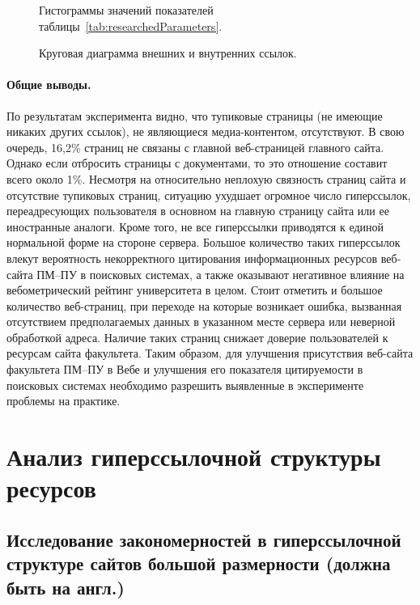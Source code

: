 \begin{figure}[ht]
	\caption{Гистограммы значений показателей таблицы~\cref{tab:researchedParameters}.}\label{fig:histogramOfTab1}
\end{figure}

\begin{figure}[ht]
	\caption{Круговая диаграмма внешних и внутренних ссылок.}\label{fig:linkDiagram}
\end{figure}

\paragraph{Общие выводы.} По результатам эксперимента видно, что тупиковые страницы (не имеющие никаких других ссылок), не являющиеся медиа-контентом, отсутствуют. В свою очередь, 16,2\% страниц не связаны с главной веб-страницей главного сайта. Однако если отбросить страницы с документами, то это отношение составит всего около 1\%.
Несмотря на относительно неплохую связность страниц сайта и отсутствие тупиковых страниц, ситуацию ухудшает огромное число гиперссылок, переадресующих пользователя в основном на главную страницу сайта или ее иностранные аналоги. Кроме того, не все гиперссылки приводятся к единой нормальной форме на стороне сервера. Большое количество таких гиперссылок влекут вероятность некорректного цитирования информационных ресурсов веб-сайта ПМ–ПУ в поисковых системах, а также оказывают негативное влияние на вебометрический рейтинг университета в целом.
Стоит отметить и большое количество веб-страниц, при переходе на которые возникает ошибка, вызванная отсутствием предполагаемых данных в указанном месте сервера или неверной обработкой адреса. Наличие таких страниц снижает доверие пользователей к ресурсам сайта факультета.
Таким образом, для улучшения присутствия веб-сайта факультета ПМ–ПУ в Вебе и улучшения его показателя цитируемости в поисковых системах необходимо разрешить выявленные в эксперименте проблемы на практике.

\section{Анализ гиперссылочной структуры ресурсов}\label{sec:ch1/sec4}

\subsection{Исследование закономерностей в гиперссылочной структуре сайтов большой размерности (должна быть на англ.)}\label{subsec:ch1/sec4/sub5}

